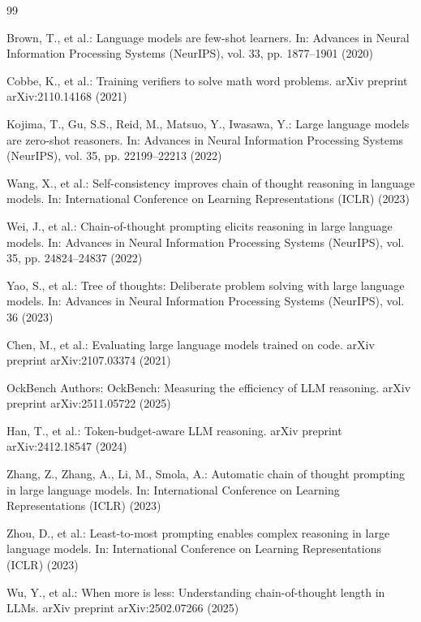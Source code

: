 ﻿\documentclass[runningheads]{llncs}
\begin{document}

\begin{thebibliography}{99}

Brown, T., et al.:
Language models are few-shot learners.
In: Advances in Neural Information Processing Systems (NeurIPS), vol. 33,
pp. 1877--1901 (2020)

Cobbe, K., et al.:
Training verifiers to solve math word problems.
arXiv preprint arXiv:2110.14168 (2021)

Kojima, T., Gu, S.S., Reid, M., Matsuo, Y., Iwasawa, Y.:
Large language models are zero-shot reasoners.
In: Advances in Neural Information Processing Systems (NeurIPS), vol. 35,
pp. 22199--22213 (2022)

Wang, X., et al.:
Self-consistency improves chain of thought reasoning in language models.
In: International Conference on Learning Representations (ICLR) (2023)

Wei, J., et al.:
Chain-of-thought prompting elicits reasoning in large language models.
In: Advances in Neural Information Processing Systems (NeurIPS), vol. 35,
pp. 24824--24837 (2022)

Yao, S., et al.:
Tree of thoughts: Deliberate problem solving with large language models.
In: Advances in Neural Information Processing Systems (NeurIPS), vol. 36
(2023)

Chen, M., et al.:
Evaluating large language models trained on code.
arXiv preprint arXiv:2107.03374 (2021)

OckBench Authors:
OckBench: Measuring the efficiency of LLM reasoning.
arXiv preprint arXiv:2511.05722 (2025)

Han, T., et al.:
Token-budget-aware LLM reasoning.
arXiv preprint arXiv:2412.18547 (2024)

Zhang, Z., Zhang, A., Li, M., Smola, A.:
Automatic chain of thought prompting in large language models.
In: International Conference on Learning Representations (ICLR) (2023)

Zhou, D., et al.:
Least-to-most prompting enables complex reasoning in large language models.
In: International Conference on Learning Representations (ICLR) (2023)

Wu, Y., et al.:
When more is less: Understanding chain-of-thought length in LLMs.
arXiv preprint arXiv:2502.07266 (2025)


\end{thebibliography}
\end{document}
